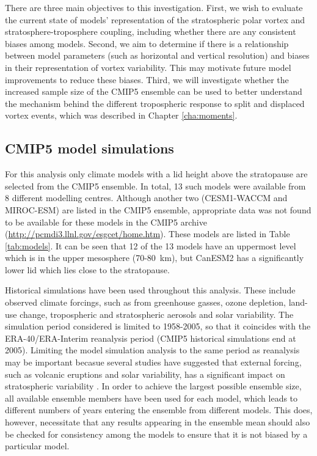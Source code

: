There are three main objectives to this investigation. First, we wish to
evaluate the current state of models' representation of the stratospheric polar
vortex and stratosphere-troposphere coupling, including whether there are any
consistent biases among models. Second, we aim to determine if there is a
relationship between model parameters (such as horizontal and vertical
resolution) and biases in their representation of vortex variability. This may
motivate future model improvements to reduce these biases. Third, we will
investigate whether the increased sample size of the CMIP5 ensemble can be used
to better understand the mechanism behind the different tropospheric response to
split and displaced vortex events, which was described in Chapter
\ref{cha:moments}.

\subsection{CMIP5 model simulations}

For this analysis only climate models with a lid height above the stratopause
are selected from the CMIP5 ensemble. In total, 13 such models were available
from 8 different modelling centres. Although another two (CESM1-WACCM and
MIROC-ESM) are listed in the CMIP5 ensemble, appropriate data was not found to
be available for these models in the CMIP5 archive
(\url{http://pcmdi3.llnl.gov/esgcet/home.htm}). These models are listed in Table
\ref{tab:models}. It can be seen that 12 of the 13 models have an uppermost
level which is in the upper mesosphere (70-80~km), but CanESM2 has a
significantly lower lid which lies close to the stratopause.

Historical simulations have been used throughout this analysis. These include
observed climate forcings, such as from greenhouse gasses, ozone depletion,
land-use change, tropospheric and stratospheric aerosols and solar
variability. The simulation period considered is limited to 1958-2005, so that
it coincides with the ERA-40/ERA-Interim reanalysis period (CMIP5 historical
simulations end at 2005). Limiting the model simulation analysis to the same
period as reanalysis may be important becasue several studies have suggested
that external forcing, such as volcanic eruptions and solar variability, has a
significant impact on stratospheric variability
\citep[e.g.,][]{Robock2000,Gray2010}. In order to achieve the largest possible
ensemble size, all available ensemble members have been used for each model,
which leads to different numbers of years entering the ensemble from different
models. This does, however, necessitate that any results appearing in the
ensemble mean should also be checked for consistency among the models to ensure
that it is not biased by a particular model.

